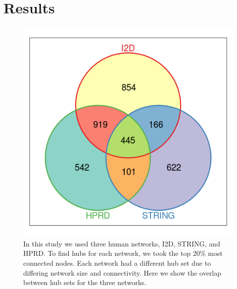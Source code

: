 

\section{Results}

\begin{figure}
\begin{center}
\includegraphics[scale=0.5]{figs/hubs_overlap}
\end{center}
\caption[Comparing hubs across human interaction networks]{\small In
  this study we used three human networks, I2D, STRING, and HPRD. To
  find hubs for each network, we took the top 20\% most connected
  nodes. Each network had a different hub set due to differing network
  size and connectivity. Here we show the overlap between hub sets for
  the three networks. \label{fig:sysBio:hubOverlap}}
\end{figure}

